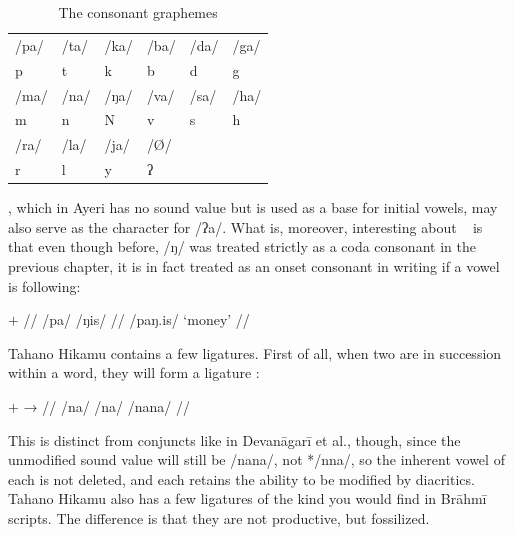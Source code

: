\begin{table}[t]
\caption{The consonant graphemes}

\begin{tabu} to \linewidth{X[c] X[c] X[c] X[c] X[c] X[c]}
\toprule
\tableheaderfont	/pa/ & /ta/ & /ka/ & /ba/ & /da/ & /ga/ \\
\rowfont{\Tagati\huge}	p & t & k & b & d & g \\

\midrule

\tableheaderfont	/ma/ & /na/ & /ŋa/ & /va/ & /sa/ & /ha/ \\
\rowfont{\Tagati\huge}	m & n & N & v & s & h \\

\midrule

\tableheaderfont	/ra/ & /la/ & /ja/ & /Ø/ \\
\rowfont{\Tagati\huge}	r & l & y & ʔ \\

\bottomrule
\end{tabu}
\label{tab:thcons}
\end{table}

, which in Ayeri has no sound value but is used as a base for initial
vowels, may also serve as the character for /ʔa/. What is, moreover,
interesting about ~ is that even though before, /ŋ/ was
treated strictly as a coda consonant in the previous chapter, it is in fact
treated as an onset consonant in writing if a vowel is following:

\ex[lingstyle=thex]\begingl
	\gla {}	$+$	 //
	\glb /pa/	{}	/ŋis/ //
	\glft {} /paŋ.is/ `money' //
\endgl\xe

Tahano Hikamu contains a few ligatures. First of all, when two 
 are in succession within a word, they will form a ligature 
:

\ex[lingstyle=thex]\begingl
	\gla {}	$+$		→	 //
	\glb /na/	{}	/na/	{}	/nana/ //
\endgl\xe

This is distinct from conjuncts like in Devanāgarī et al., though, since the
unmodified sound value will still be /nana/, not */nna/, so the inherent vowel
of each   is not deleted, and each   retains
the ability to be modified by diacritics. Tahano Hikamu also has a few
ligatures of the kind you would find in Brāhmī scripts. The difference is that
they are not productive, but fossilized.

